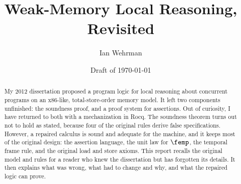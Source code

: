 \documentclass[11pt]{article}
\title{Weak-Memory Local Reasoning, Revisited}
\author{Ian Wehrman}
\date{Draft of \today}
\begin{document}
\maketitle

\begin{abstract}
My 2012 dissertation proposed a program logic for local reasoning about
concurrent programs on an x86-like, total-store-order memory model. It left
two components unfinished: the soundness proof, and a proof system for
assertions. Out of curiosity, I have returned to both with a mechanization
in Rocq. The soundness theorem turns out not to hold as stated, because four
of the original rules derive false specifications. However, a repaired
calculus is sound and adequate for the machine, and it keeps most of the
original design: the assertion language, the unit law for $\femp$, the
temporal frame rule, and the original load and store axioms. This report
recalls the original model and rules for a reader who knew the dissertation
but has forgotten its details. It then explains what was wrong, what had to
change and why, and what the repaired logic can prove.
\end{abstract}












\end{document}
